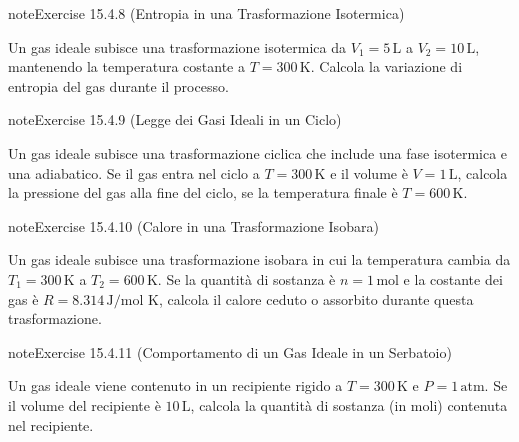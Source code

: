 \documentclass[letterpaper,10pt,italian]{jupyterBook}
\begin{document}
\begin{sphinxadmonition}{note}{Exercise 15.4.8 (Entropia in una Trasformazione Isotermica)}



\sphinxAtStartPar
Un gas ideale subisce una trasformazione isotermica da \(V_1 = 5 \, \text{L}\) a \(V_2 = 10 \, \text{L}\), mantenendo la temperatura costante a \(T = 300 \, \text{K}\). Calcola la variazione di entropia del gas durante il processo.
\end{sphinxadmonition}
 \label{exercise:ch/thermodynamics/matter-problems-exercise-8}

\begin{sphinxadmonition}{note}{Exercise 15.4.9 (Legge dei Gasi Ideali in un Ciclo)}



\sphinxAtStartPar
Un gas ideale subisce una trasformazione ciclica che include una fase isotermica e una adiabatico. Se il gas entra nel ciclo a \(T = 300 \, \text{K}\) e il volume è \(V = 1 \, \text{L}\), calcola la pressione del gas alla fine del ciclo, se la temperatura finale è \(T = 600 \, \text{K}\).
\end{sphinxadmonition}
 \label{exercise:ch/thermodynamics/matter-problems-exercise-9}

\begin{sphinxadmonition}{note}{Exercise 15.4.10 (Calore in una Trasformazione Isobara)}



\sphinxAtStartPar
Un gas ideale subisce una trasformazione isobara in cui la temperatura cambia da \(T_1 = 300 \, \text{K}\) a \(T_2 = 600 \, \text{K}\). Se la quantità di sostanza è \(n = 1 \, \text{mol}\) e la costante dei gas è \(R = 8.314 \, \text{J/mol K}\), calcola il calore ceduto o assorbito durante questa trasformazione.
\end{sphinxadmonition}
 \label{exercise:ch/thermodynamics/matter-problems-exercise-10}

\begin{sphinxadmonition}{note}{Exercise 15.4.11 (Comportamento di un Gas Ideale in un Serbatoio)}



\sphinxAtStartPar
Un gas ideale viene contenuto in un recipiente rigido a \(T = 300 \, \text{K}\) e \(P = 1 \, \text{atm}\). Se il volume del recipiente è \(10 \, \text{L}\), calcola la quantità di sostanza (in moli) contenuta nel recipiente.
\end{sphinxadmonition}
 \label{exercise:ch/thermodynamics/matter-problems-exercise-11}
\end{document}
